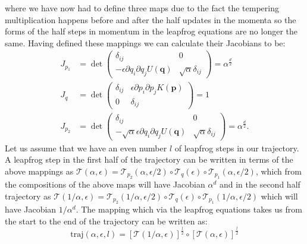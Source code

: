 \documentclass[12pt]{article}
\begin{document}
    where we have now had to define three maps due to the fact the tempering multiplication happens before and after the half updates in the momenta so the forms of the half steps in momentum in the leapfrog equations are no longer the same. Having defined these mappings we can calculate their Jacobians to be:
    \begin{align}
        J_{p_1} & = \det\begin{pmatrix} \delta_{ij} & 0 \\ -\epsilon\partial q_i \partial q_j U\left(\bm{q}\right) & \sqrt{\alpha}\delta_{ij} \end{pmatrix} = \alpha^\frac{d}{2} \\
        J_{q} & = \det\begin{pmatrix} \delta_{ij} & \epsilon\partial p_i \partial p_j K\left(\bm{p}\right) \\ 0 & \delta_{ij} \end{pmatrix} = 1 \\
        J_{p_2} & = \det\begin{pmatrix} \delta_{ij} & 0 \\ -\sqrt{\alpha}\epsilon\partial q_i \partial q_j U\left(\bm{q}\right) & \sqrt{\alpha}\delta_{ij} \end{pmatrix} = \alpha^\frac{d}{2}.
    \end{align}
    Let us assume that we have an even number $l$ of leapfrog steps in our trajectory. A leapfrog step in the first half of the trajectory can be written in terms of the above mappings as $\mathcal{T}\left(\alpha,\epsilon\right) = \mathcal{T}_{p_2}\left(\alpha,\epsilon/2\right)\circ\mathcal{T}_q\left(\epsilon\right)\circ\mathcal{T}_{p_1}\left(\alpha,\epsilon/2\right)$, which from the compositions of the above maps will have Jacobian $ \alpha^d $ and in the second half trajectory as $\mathcal{T}\left(1/\alpha,\epsilon\right) = \mathcal{T}_{p_2}\left(1/\alpha,\epsilon/2\right)\circ\mathcal{T}_q\left(\epsilon\right)\circ\mathcal{T}_{p_1}\left(1/\alpha,\epsilon/2\right)$ which will have Jacobian $1/\alpha^{d}$. The mapping which via the leapfrog equations takes us from the start to the end of the trajectory can be written as:
    \begin{equation}
        \text{traj}\left(\alpha,\epsilon,l\right)=\left[\mathcal{T}\left(1/\alpha,\epsilon\right)\right]^{\frac{l}{2}}\circ\left[\mathcal{T}\left(\alpha,\epsilon\right)\right]^{\frac{l}{2}}
    \end{equation}
\end{document}
